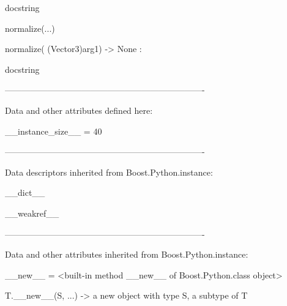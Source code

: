 \documentclass[letterpaper,10pt,english]{sphinxmanual}
\begin{document}
\begin{description}
\begin{description}
\begin{DUlineblock}{0em}
\begin{DUlineblock}{\DUlineblockindent}
\item[]
\begin{DUlineblock}{\DUlineblockindent}
\item[] docstring
\item[] 
\end{DUlineblock}
\end{DUlineblock}
\item[] normalize(...)
\item[]
\begin{DUlineblock}{\DUlineblockindent}
\item[] normalize( (Vector3)arg1) -\textgreater{} None :
\item[]
\begin{DUlineblock}{\DUlineblockindent}
\item[] docstring
\item[] 
\end{DUlineblock}
\end{DUlineblock}
\item[] ----------------------------------------------------------------------
\item[] Data and other attributes defined here:
\item[] 
\item[] \_\_instance\_size\_\_ = 40
\item[] 
\item[] ----------------------------------------------------------------------
\item[] Data descriptors inherited from Boost.Python.instance:
\item[] 
\item[] \_\_dict\_\_
\item[] 
\item[] \_\_weakref\_\_
\item[] 
\item[] ----------------------------------------------------------------------
\item[] Data and other attributes inherited from Boost.Python.instance:
\item[] 
\item[] \_\_new\_\_ = \textless{}built-in method \_\_new\_\_ of Boost.Python.class object\textgreater{}
\item[]
\begin{DUlineblock}{\DUlineblockindent}
\item[] T.\_\_new\_\_(S, ...) -\textgreater{} a new object with type S, a subtype of T
\end{DUlineblock}
\end{DUlineblock}


\end{description}
\end{description}
\end{document}
